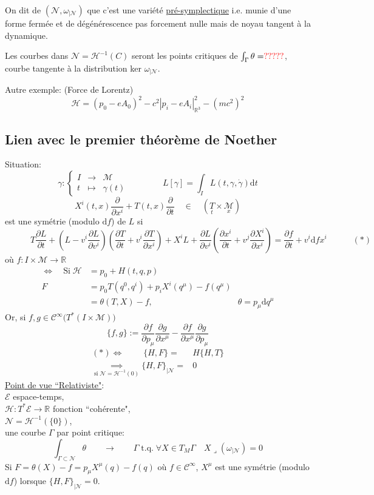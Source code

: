 \documentclass[a4paper,11pt]{article}
\renewcommand{\d}{{\mathrm{d}}}
\newcommand{\dr}[2]{\frac{\partial {#1}}{\partial{#2}}}
\begin{document}
On dit de $\left(\mathcal{N},\omega_{|\mathcal{N}}\right)$ que c'est une variété \underline{pré-symplectique} i.e. munie d'une forme fermée et de dégénérescence pas forcement nulle mais de noyau tangent à la dynamique.

Les courbes dans $\mathcal{N}= \mathcal{H}^{-1}(C)$ seront les points critiques de $\int_\Gamma \theta = \color{red} ?????\color{black}$, courbe tangente à la distribution ker $\omega_{|\mathcal{N}}$.

\noindent Autre exemple: (Force de Lorentz)
$$\mathcal{H} = (p_0 - eA_0)^2 - c^2|p_i-eA_i|^2_{\mathbb{R}^3} - (mc^2)^2$$

\subsection{Lien avec le premier théorème de Noether}
Situation:
$$\gamma : \left\{ \begin{matrix}
I & \to & \mathcal{M}\\
t & \mapsto & \gamma(t)
\end{matrix}\right.
\quad \quad \quad \quad
L[\gamma]=\int_I L(t,\gamma,\dot\gamma)\d t$$
$$X^i(t,x)\dr{}{x^i} + T(t,x)\dr{}t \quad \in \quad (\underset t T \times \underset x {\mathcal{M}})$$
est une symétrie (modulo $\d f$) de $L$ si 
$$\quad \quad \quad T\dr L t + \left(L - v^i \dr L {v^i}\right)\left(\dr T t + v^i \dr T {x^i}\right) + X^iL + \dr L{v^i} \left(\dr {x^i} t + v^j \dr{X^i}{x^i}\right)
= \dr f t + v^i \d f {x^i} \quad \quad \quad (*)$$
où $f: I\times\mathcal{M}\to \mathbb{R}$
\begin{align*}
\iff \quad \mathrm{Si}\; \mathcal{H} &= p_0 + H(t,q,p)\\
F &= p_0 T(q^0,q^i) + p_i X^i(q^\mu) - f(q^\mu)\\
&= \theta(T,X) - f, \quad\quad\quad\quad\quad\quad\quad\quad\quad\quad \theta=p_\mu\d q^\mu
\end{align*}
Or, si $f,g\in \mathcal{C}^\infty\big(T^*(I\times\mathcal{M})\big)$
$$\{f,g\} := \dr f{p_\mu}\dr g{x^\mu} - \dr f{x^\mu}\dr g{p_\mu}$$
\begin{align*}
(*) \iff \quad \quad \;\{H,F\} =& H\{H,T\}\\
\underset {\mathrm{si}\; \mathcal{N}=\mathcal{H}^{-1}(0)} \implies \{H,F\}_{|\mathcal{N}} =& 0
\end{align*}
\underline{Point de vue ``Relativiste"}:\\
$\mathcal{E}$ espace-temps,\\
$\mathcal{H}: T^*\mathcal{E}\to\mathbb{R}$ fonction ``cohérente",\\
$\mathcal{N}=\mathcal{H}^{-1}(\{0\})$,\\
une courbe $\Gamma$ par point critique:
$$\int_{\Gamma\subset\mathcal{N}} \theta \quad \quad \to \quad \quad \Gamma \; \mathrm{t}.\mathrm{q}. \;\forall X\in T_M\Gamma\quad X\lrcorner(\omega_{|\mathcal{N}}) = 0$$
Si $F=\theta(X) - f = p_\mu X^\mu (q) - f(q)$ où $f\in\mathcal{C}^\infty$, $X^\mu$ est une symétrie (modulo $\d f$) lorsque $\{H,F\}_{|\mathcal{N}}=0$.
\end{document}

